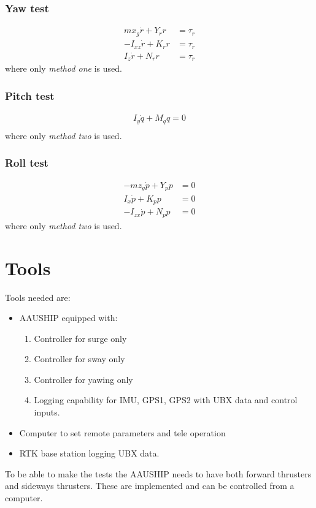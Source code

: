 \subsubsection{Yaw test}
\begin{align}
mx_g\dot r + Y_rr &= \tau_{r}\\
-I_{xz}\dot r + K_rr &= \tau_{r}\\
I_z\dot r + N_rr &= \tau_{r}
\end{align}
where only \textit{method one} is used.

\subsubsection{Pitch test}
\begin{align}
I_y\dot q + M_qq = 0\\
\end{align}
where only \textit{method two} is used.

\subsubsection{Roll test}
\begin{align}
-mz_g\dot p + Y_pp &= 0\\
I_x\dot p + K_pp &= 0\\
-I_{zx}\dot p + N_pp &= 0
\end{align}
where only \textit{method two} is used.

\section{Tools}
Tools needed are:
\begin{itemize}
	\item AAUSHIP equipped with:
		\begin{enumerate}
			\item Controller for surge only
			\item Controller for sway only
			\item Controller for yawing only
			\item Logging capability for \ac{IMU}, GPS1, GPS2 with UBX data
				and control inputs.
		\end{enumerate}
	\item Computer to set remote parameters and tele operation
	\item RTK base station logging UBX data.
\end{itemize}
To be able to make the tests the AAUSHIP needs to have both forward thrusters and sideways thrusters. These are implemented and can be controlled from a computer.

